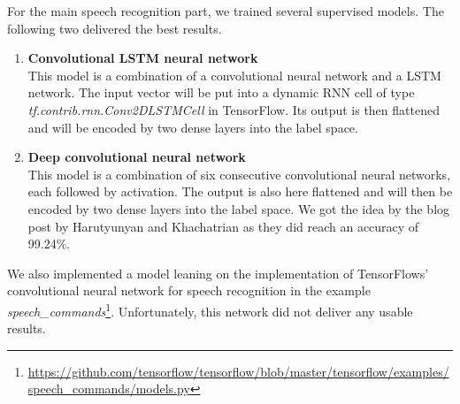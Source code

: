 For the main speech recognition part, we trained several supervised models. The following two delivered the best results.
\begin{enumerate}
	\item \textbf{Convolutional LSTM neural network} \\
	This model is a combination of a convolutional neural network and a LSTM network. The input vector will be put into a dynamic RNN cell of type \newline\textit{tf.contrib.rnn.Conv2DLSTMCell} in TensorFlow. Its output is then flattened and will be encoded by two dense layers into the label space.
	\item \textbf{Deep convolutional neural network} \\
	This model is a combination of six consecutive convolutional neural networks, each followed by activation. The output is also here flattened and will then be encoded by two dense layers into the label space. We got the idea by the blog post by Harutyunyan and Khachatrian as they did reach an accuracy of 99.24\%.
\end{enumerate}
We also implemented a model leaning on the implementation of TensorFlows' convolutional neural network for speech recognition in the example \textit{speech\_commands}\footnote{\url{https://github.com/tensorflow/tensorflow/blob/master/tensorflow/examples/speech\_commands/models.py}}. Unfortunately, this network did not deliver any usable results.
